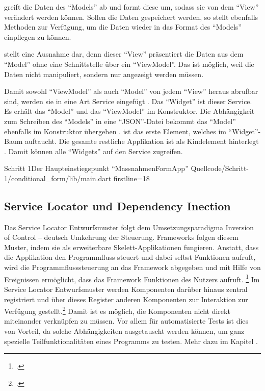   greift die Daten des \enquote{Models} ab und formt diese um, sodass sie von dem \enquote{View}   verändert werden können.
Sollen die Daten gespeichert werden, so stellt  ebenfalls Methoden zur Verfügung, um die Daten wieder in das Format des \enquote{Models} einpflegen zu können.

  stellt eine Ausnahme dar, denn dieser \enquote{View} präsentiert die Daten aus dem \enquote{Model} ohne eine Schnittstelle über ein \enquote{ViewModel}.
Das ist möglich, weil die Daten nicht manipuliert, sondern nur angezeigt werden müssen.

Damit sowohl \enquote{ViewModel} als auch \enquote{Model} von jedem \enquote{View} heraus abrufbar sind, werden sie in eine Art Service eingefügt .
Das \enquote{Widget}  ist dieser Service.
 Es erhält das \enquote{Model}  und das \enquote{ViewModel}   im Konstruktor.
Die Abhängigkeit zum Schreiben des \enquote{Models} in eine \enquote{JSON}-Datei  bekommt das \enquote{Model} ebenfalls im Konstruktor übergeben .
 ist das erste Element, welches im \enquote{Widget}-Baum auftaucht.
Die gesamte restliche Applikation ist als Kindelement hinterlegt .
Damit können alle \enquote{Widgets} auf den Service zugreifen.

\begin{alexlisting}{Schritt 1}{Der Haupteinstiegspunkt \enquote{MassnahmenFormApp}}
  {Quellcode/Schritt-1/conditional_form/lib/main.dart}
  {firstline=18}
  \label{lst:Schritt1DerHaupteinstiegspunkt}
\end{alexlisting}

\clearpage
\subsection{Service Locator und Dependency Inection}

Das Service Locator Entwurfsmuster folgt dem Umsetzungsparadigma Inversion of Control -- deutsch Umkehrung der Steuerung.
Frameworks folgen diesem Muster, indem sie als erweiterbare Skelett-Applikationen fungieren.
Anstatt, dass die Applikation den Programmfluss steuert und dabei selbst Funktionen aufruft, wird die Programmflusssteuerung an das Framework abgegeben und mit Hilfe von Ereignissen ermöglicht, dass das Framework Funktionen des Nutzers aufruft.
\footcite[Vgl.][]{johnson1988designing}
Im Service Locator Entwurfsmuster werden Komponenten darüber hinaus zentral registriert und über dieses Register anderen Komponenten zur Interaktion zur Verfügung gestellt.\footcite[Vgl.][]{fowler2004DependencyInjection}
Damit ist es möglich, die Komponenten nicht direkt miteinander verknüpfen zu müssen.
Vor allem für automatisierte Tests ist dies von Vorteil, da solche Abhängigkeiten ausgetauscht werden können, um ganz spezielle Teilfunktionalitäten eines Programms zu testen.
 Mehr dazu im Kapitel .


